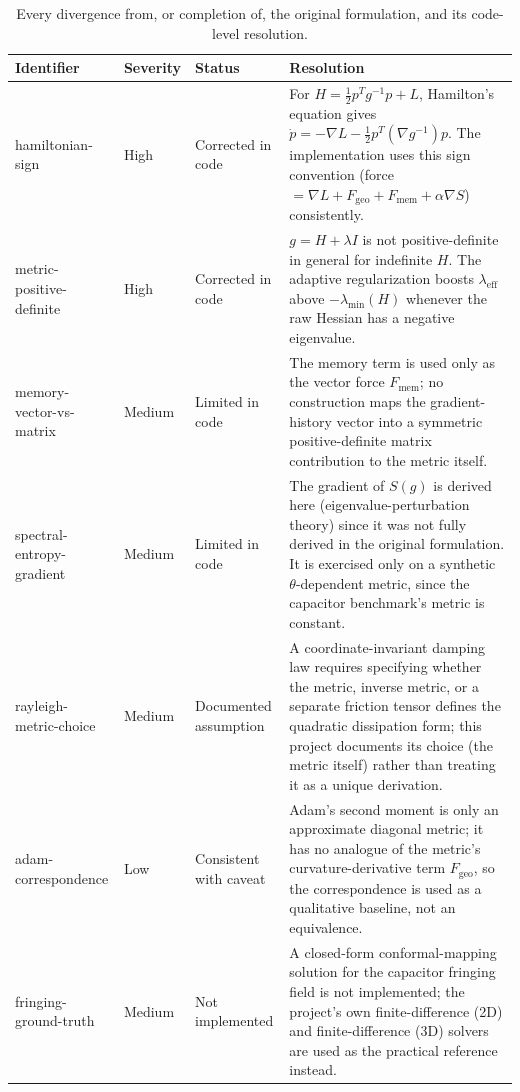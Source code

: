 \documentclass[11pt]{article}
\begin{document}
\begin{table}[htbp]
\centering
\small
\begin{tabular}{@{}p{2.6cm}p{1.1cm}p{3.6cm}p{7cm}@{}}
\toprule
\textbf{Identifier} & \textbf{Severity} & \textbf{Status} & \textbf{Resolution} \\
\midrule
hamiltonian-sign & High & Corrected in code &
For $H = \tfrac12 p^Tg^{-1}p + L$, Hamilton's equation gives
$\dot p = -\nabla L - \tfrac12 p^T(\nabla g^{-1})p$. The implementation uses this
sign convention (force $= \nabla L + F_{\mathrm{geo}} + F_{\mathrm{mem}} + \alpha\nabla S$)
consistently. \\
metric-positive-definite & High & Corrected in code &
$g = H + \lambda I$ is not positive-definite in general for indefinite $H$. The
adaptive regularization boosts $\lambda_{\mathrm{eff}}$ above $-\lambda_{\min}(H)$
whenever the raw Hessian has a negative eigenvalue. \\
memory-vector-vs-matrix & Medium & Limited in code &
The memory term is used only as the vector force $F_{\mathrm{mem}}$; no construction
maps the gradient-history vector into a symmetric positive-definite matrix contribution
to the metric itself. \\
spectral-entropy-gradient & Medium & Limited in code &
The gradient of $S(g)$ is derived here (eigenvalue-perturbation theory) since it was not
fully derived in the original formulation. It is exercised only on a synthetic
$\theta$-dependent metric, since the capacitor benchmark's metric is constant. \\
rayleigh-metric-choice & Medium & Documented assumption &
A coordinate-invariant damping law requires specifying whether the metric, inverse
metric, or a separate friction tensor defines the quadratic dissipation form; this
project documents its choice (the metric itself) rather than treating it as a unique
derivation. \\
adam-correspondence & Low & Consistent with caveat &
Adam's second moment is only an approximate diagonal metric; it has no analogue of the
metric's curvature-derivative term $F_{\mathrm{geo}}$, so the correspondence is used as
a qualitative baseline, not an equivalence. \\
fringing-ground-truth & Medium & Not implemented &
A closed-form conformal-mapping solution for the capacitor fringing field is not
implemented; the project's own finite-difference (2D) and finite-difference (3D)
solvers are used as the practical reference instead. \\
\bottomrule
\end{tabular}
\caption{Every divergence from, or completion of, the original formulation, and its
code-level resolution.}
\label{tab:corrections}
\end{table}
\end{document}
